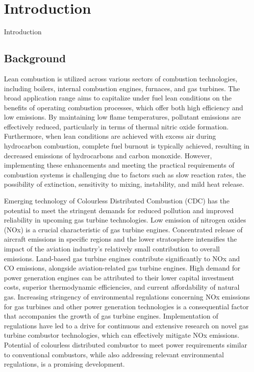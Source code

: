 \chapter[Introduction]{Introduction}{Introduction}\label{CH1:Intro}

\section{Background}
Lean combustion is utilized across various sectors of combustion technologies, including boilers, internal combustion engines, furnaces, and gas turbines. The broad application range aims to capitalize under fuel lean conditions on the benefits of operating combustion processes, which offer both high efficiency and low emissions. By maintaining low flame temperatures, pollutant emissions are effectively reduced, particularly in terms of thermal nitric oxide formation. Furthermore, when lean conditions are achieved with excess air during hydrocarbon combustion, complete fuel burnout is typically achieved, resulting in decreased emissions of hydrocarbons and carbon monoxide. However, implementing these enhancements and meeting the practical requirements of combustion systems is challenging due to factors such as slow reaction rates, the possibility of extinction, sensitivity to mixing, instability, and mild heat release.

Emerging technology of Colourless Distributed Combustion (CDC) \cite{VAThesis2011,VA2011} has the potential to meet the stringent demands for reduced pollution and improved reliability in upcoming gas turbine technologies. Low emission of nitrogen oxides (NOx) is a crucial characteristic of gas turbine engines. Concentrated release of aircraft emissions in specific regions and the lower stratosphere intensifies the impact of the aviation industry's relatively small contribution to overall emissions. Land-based gas turbine engines contribute significantly to NOx and CO emissions, alongside aviation-related gas turbine engines. High demand for power generation engines can be attributed to their lower capital investment costs, superior thermodynamic efficiencies, and current affordability of natural gas. Increasing stringency of environmental regulations concerning NOx emissions for gas turbines and other power generation technologies is a consequential factor that accompanies the growth of gas turbine engines. Implementation of regulations have led to a drive for continuous and extensive research on novel gas turbine combustor technologies, which can effectively mitigate NOx emissions. Potential of colourless distributed combustor to meet power requirements similar to conventional combustors, while also addressing relevant environmental regulations, is a promising development.

